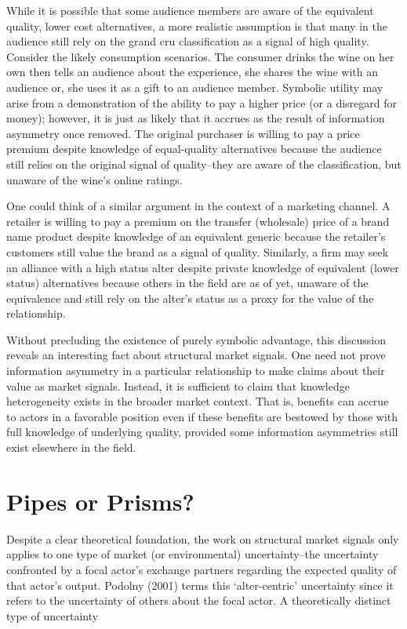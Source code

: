 While it is possible that some audience members are aware of the equivalent quality, lower cost alternatives, a more realistic assumption is that many in the audience still rely on the grand cru classification as a signal of high quality. Consider the likely consumption scenarios. The consumer drinks the wine on her own then tells an audience about the experience, she shares the wine with an audience or, she uses it as a gift to an audience member. Symbolic utility may arise from a demonstration of the ability to pay a higher price (or a disregard for money); however, it is just as likely that it accrues as the result of information asymmetry once removed. The original purchaser is willing to pay a price premium despite knowledge of equal-quality alternatives because the audience still relies on the original signal of quality--they are aware of the classification, but unaware of the wine's online ratings. 

One could think of a similar argument in the context of a marketing channel. A retailer is willing to pay a premium on the transfer (wholesale) price of a brand name product despite knowledge of an equivalent generic because the retailer's customers still value the brand as a signal of quality. Similarly, a firm may seek an alliance with a high status alter despite private knowledge of equivalent (lower status) alternatives because others in the field are as of yet, unaware of the equivalence and still rely on the alter's status as a proxy for the value of the relationship.  

Without precluding the existence of purely symbolic advantage, this discussion reveals an interesting fact about structural market signals. One need not prove information asymmetry in a particular relationship to make claims about their value as market signals. Instead, it is sufficient to claim that knowledge heterogeneity exists in the broader market context. That is, benefits can accrue to actors in a favorable position even if these benefits are bestowed by those with full knowledge of underlying quality, provided some information asymmetries still exist elsewhere in the field. 

\section{Pipes or Prisms?}

Despite a clear theoretical foundation, the work on structural market signals only applies to one type of market (or environmental) uncertainty--the uncertainty confronted by a focal actor's exchange partners regarding the expected quality of that actor's output. Podolny (2001) terms this `alter-centric' uncertainty since it refers to the uncertainty of others about the focal actor. A theoretically distinct type of uncertainty 

